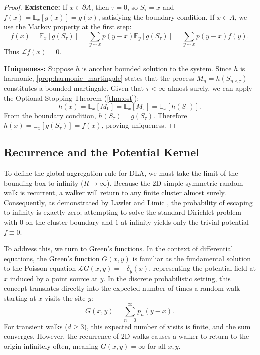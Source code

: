 \documentclass[12pt, a4paper, oneside]{report}
\theoremstyle{remark}
\begin{document}
\begin{proof}

\noindent \textbf{Existence:} 
If $x \in \partial A$, then $\tau = 0$, so $S_\tau = x$ and $f(x) = \mathbb{E}_x[g(x)] = g(x)$, satisfying the boundary condition. If $x \in A$, we use the Markov property at the first step:
\begin{equation*}
    f(x) = \mathbb{E}_x[g(S_\tau)] = \sum_{y \sim x} p(y-x) \mathbb{E}_y[g(S_\tau)] = \sum_{y \sim x} p(y-x) f(y).
\end{equation*}
Thus $\mathcal{L}f(x) = 0$.

\noindent \textbf{Uniqueness:} 
Suppose $h$ is another bounded solution to the system. Since $h$ is harmonic, \cref{prop:harmonic_martingale} states that the process $M_n = h(S_{n \land \tau})$ constitutes a bounded martingale. Given that $\tau < \infty$ almost surely, we can apply the Optional Stopping Theorem (\cref{thm:ost}):
\begin{equation*}
    h(x) = \mathbb{E}_x[M_0] = \mathbb{E}_x[M_\tau] = \mathbb{E}_x[h(S_\tau)].
\end{equation*}
From the boundary condition, $h(S_\tau) = g(S_\tau)$. Therefore $h(x) = \mathbb{E}_x[g(S_\tau)] = f(x)$, proving uniqueness.
\end{proof}


\subsection{Recurrence and the Potential Kernel}
\label{sec:potential_kernel}

To define the global aggregation rule for DLA, we must take the limit of the bounding box to infinity ($R \to \infty$). Because the 2D simple symmetric random walk is recurrent, a walker will return to any finite cluster almost surely. Consequently, as demonstrated by Lawler and Limic \cite[Proposition 6.2.2]{Lawler2010}, the probability of escaping to infinity is exactly zero; attempting to solve the standard Dirichlet problem with $0$ on the cluster boundary and $1$ at infinity yields only the trivial potential $f \equiv 0$.

To address this, we turn to Green's functions. In the context of differential equations, the Green's function $G(x,y)$ is familiar as the fundamental solution to the Poisson equation $\mathcal{L} G(x,y) = -\delta_y(x)$, representing the potential field at $x$ induced by a point source at $y$. In the discrete probabilistic setting, this concept translates directly into the expected number of times a random walk starting at $x$ visits the site $y$:
\begin{equation*}
    G(x,y) = \sum_{n=0}^\infty p_n(y-x).
\end{equation*}
For transient walks ($d \ge 3$), this expected number of visits is finite, and the sum converges. However, the recurrence of 2D walks causes a walker to return to the origin infinitely often, meaning $G(x,y) = \infty$ for all $x,y$.
\end{document}
